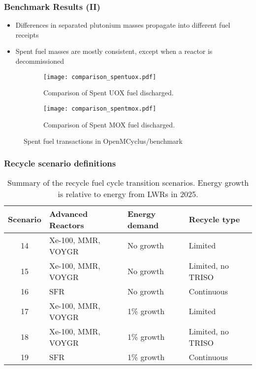 \begin{frame}
    \frametitle{Benchmark Results (II)}
        \begin{itemize}
            \item Differences in separated plutonium masses 
                  propagate into different fuel receipts 
            \item Spent fuel masses are mostly consistent, except 
                  when a reactor is decommissioned
        \end{itemize}
        \begin{figure}
            \centering
            \begin{subfigure}{0.48\textwidth}
                \texttt{[image: comparison\_spentuox.pdf]}
                \caption{Comparison of Spent UOX fuel discharged.}
            \end{subfigure}
            \hfill
            \begin{subfigure}{0.48\textwidth}
                \texttt{[image: comparison\_spentmox.pdf]}
                \caption{Comparison of Spent MOX fuel discharged.}
            \end{subfigure}
            \caption{Spent fuel transactions in OpenMCyclus/\Cycamore benchmark}
            \label{fig:spentfuel_benchmark}
        \end{figure}

\end{frame}

\begin{frame}
    \frametitle{Recycle scenario definitions}
    \begin{table}[ht]
        \centering
        \caption{Summary of the recycle fuel cycle transition scenarios.
        Energy growth is relative to energy from \glspl{LWR} in 2025.}
        \label{tab:scenarios_recycle}
        \begin{tabular}{c l l l}
            \hline
            Scenario & Advanced Reactors & Energy demand & Recycle type\\\hline
            \rowcolor{lightorange}14 & Xe-100, MMR, VOYGR & No growth & Limited \\
            \rowcolor{lightorange}15 & Xe-100, MMR, VOYGR & No growth & Limited, no TRISO\\
            \rowcolor{lightorange}16 & SFR& No growth & Continuous \\
            \rowcolor{lightpink}17 & Xe-100, MMR, VOYGR & 1\% growth & Limited \\
            \rowcolor{lightpink}18 & Xe-100, MMR, VOYGR & 1\% growth & Limited, no TRISO\\
            \rowcolor{lightpink}19 & SFR & 1\% growth & Continuous\\
            \hline
    \end{tabular}
    \end{table}
\end{frame}


